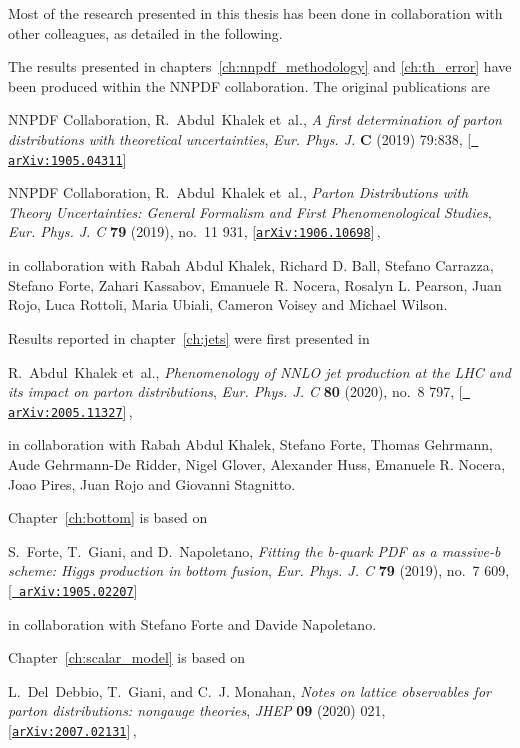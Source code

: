 
Most of the research presented in this thesis has been done in collaboration with other colleagues,
as detailed in the following.

The results presented in chapters~\ref{ch:nnpdf_methodology} and \ref{ch:th_error}
have been produced within the NNPDF collaboration. The original publications are

NNPDF Collaboration, R.~Abdul~Khalek et~al., {\it {A first determination
  of parton distributions with theoretical uncertainties}},  {\em Eur. Phys.
  J.} {\bf C} (2019) 79:838, [\href{http://arxiv.org/abs/1905.04311}{{\tt
  arXiv:1905.04311}}]

NNPDF Collaboration, R.~Abdul~Khalek et~al., {\it {Parton Distributions
  with Theory Uncertainties: General Formalism and First Phenomenological
  Studies}},  {\em Eur. Phys. J. C} {\bf 79} (2019), no.~11 931,
  [\href{http://arxiv.org/abs/1906.10698}{{\tt arXiv:1906.10698}}]\,,

in collaboration with Rabah Abdul Khalek, Richard D. Ball, Stefano Carrazza, Stefano Forte,
Zahari Kassabov, Emanuele R. Nocera, Rosalyn L. Pearson, Juan Rojo, Luca Rottoli,
Maria Ubiali, Cameron Voisey and Michael Wilson.


Results reported in chapter~\ref{ch:jets} were first presented in 

R.~Abdul~Khalek et~al., {\it {Phenomenology of NNLO jet production at the LHC
  and its impact on parton distributions}},  {\em Eur. Phys. J. C} {\bf 80}
  (2020), no.~8 797, [\href{http://arxiv.org/abs/2005.11327}{{\tt
  arXiv:2005.11327}}]\,,

in collaboration with Rabah Abdul Khalek, Stefano Forte, Thomas Gehrmann, Aude Gehrmann-De Ridder,
Nigel Glover, Alexander Huss, Emanuele R. Nocera, Joao Pires, Juan Rojo and Giovanni Stagnitto.

Chapter~\ref{ch:bottom} is based on

S.~Forte, T.~Giani, and D.~Napoletano, {\it {Fitting the b-quark PDF as a
  massive-b scheme: Higgs production in bottom fusion}},  {\em Eur. Phys. J. C}
  {\bf 79} (2019), no.~7 609, [\href{http://arxiv.org/abs/1905.02207}{{\tt
  arXiv:1905.02207}}]

in collaboration with Stefano Forte and Davide Napoletano.

Chapter~\ref{ch:scalar_model} is based on

L.~Del~Debbio, T.~Giani, and C.~J. Monahan, {\it {Notes on lattice observables
  for parton distributions: nongauge theories}},  {\em JHEP} {\bf 09} (2020)
  021, [\href{http://arxiv.org/abs/2007.02131}{{\tt arXiv:2007.02131}}]\,,

